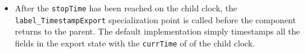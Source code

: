 \begin{itemize}
\begin{itemize}
\end{itemize}
\item After the {\tt stopTime} has been reached on the child clock, the {\tt label\_TimestampExport} specialization point is called before the component returns to the parent. The default implementation simply timestamps all the fields in the export state with the {\tt currTime} of of the child clock.
\end{itemize}


